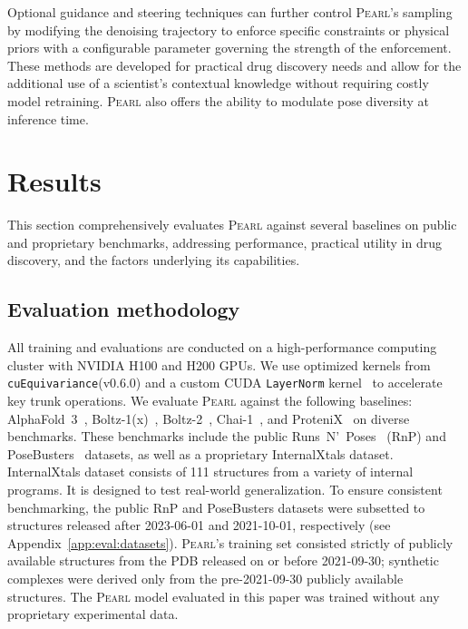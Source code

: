 \documentclass[11pt, letterpaper, onecolumn]{tau-class/tau}
\newcommand{\pearl}{\textsc{Pearl}\xspace}
\newcommand{\alphafold}[1]{AlphaFold~#1\xspace}
\newcommand{\boltz}[1]{\mbox{Boltz-#1\xspace}}
\newcommand{\chai}[1]{\mbox{Chai-#1\xspace}}
\newcommand{\protenix}{ProteniX\xspace}
\newcommand{\runsnposes}{Runs~N'~Poses\xspace}
\newcommand{\posebusters}{PoseBusters\xspace}
\newcommand{\internalxtals}{InternalXtals\xspace}
\newcommand{\fmtdate}[1]{\mbox{#1\xspace}}
\newcommand{\cuequivariance}{\texttt{cuEquivariance}\xspace}
\newcommand{\layernorm}{\texttt{LayerNorm}\xspace}
\begin{document}
Optional guidance and steering techniques can further control \pearl's sampling by modifying the denoising trajectory to enforce specific constraints or physical priors with a configurable parameter governing the strength of the enforcement. These methods are developed for practical drug discovery needs and allow for the additional use of a scientist's contextual knowledge without requiring costly model retraining. \pearl also offers the ability to modulate pose diversity at inference time.


\section{Results}
\label{sec:results}
This section comprehensively evaluates \pearl against several baselines on public and proprietary benchmarks, addressing performance, practical utility in drug discovery, and the factors underlying its capabilities. 

\subsection{Evaluation methodology}
\label{sec:results:eval}

All training and evaluations are conducted on a high-performance computing cluster with NVIDIA H100 and H200 GPUs. We use optimized kernels from \cuequivariance (v0.6.0) \cite{nvidia_cuequivariance_github} and a custom CUDA \layernorm kernel~\cite{bytedance2025protenix} to accelerate key trunk operations. 
We evaluate \pearl against the following baselines: \alphafold3~\cite{abramson2024accurate}, \boltz1(x)~\cite{wohlwend2024boltz1}, \boltz2~\cite{passaro2025boltz2}, \chai1~\cite{chai2024chai}, and \protenix~\cite{bytedance2025protenix} on diverse benchmarks. These benchmarks include the public \runsnposes~\cite{vskrinjar2025have} (RnP) and \posebusters~\cite{buttenschoen2024posebusters} datasets, as well as a proprietary \internalxtals dataset. \internalxtals dataset consists of 111 structures from a variety of internal programs.
It is designed to test real-world generalization. To ensure consistent benchmarking, the public RnP and \posebusters datasets were subsetted to structures released after \fmtdate{2023-06-01} and \fmtdate{2021-10-01}, respectively (see Appendix~\ref{app:eval:datasets}).
\pearl's training set consisted strictly of publicly available structures from the PDB released on or before \fmtdate{2021-09-30}; synthetic complexes were derived only from the pre-\fmtdate{2021-09-30} publicly available structures.
The \pearl model evaluated in this paper was trained without any proprietary experimental data.
\end{document}
